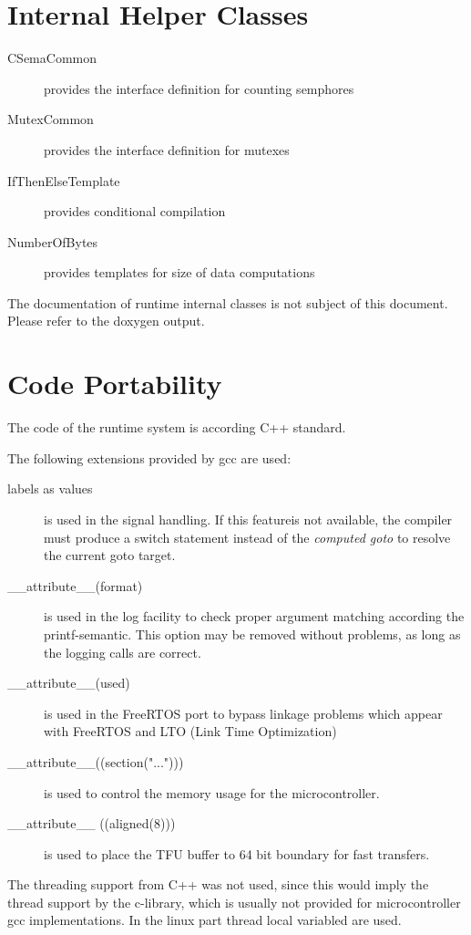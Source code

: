 	\section{Internal Helper Classes}
	\begin{description}
	\item[CSemaCommon]  provides the interface definition for counting semphores
	\item[MutexCommon] provides the interface definition for mutexes
	\item[IfThenElseTemplate] provides conditional compilation
	\item[NumberOfBytes] provides templates for size of data computations
	\end{description}
	The documentation of runtime internal classes is not subject of this document.
	Please refer to the doxygen output.

	\section{Code Portability}
	The code of the runtime system is according C++ standard.

	The following extensions provided by gcc are used:
	\begin{description}
	\item[labels as values] is used in the signal handling. 
	   If this featureis not available, the compiler must produce a switch 
	   statement instead of the {\em computed goto} to resolve
	   the current goto target.
	\item[\_\_attribute\_\_(format)] is used in the log facility to check
	   proper argument matching according the printf-semantic.
	   This option may be removed without problems, as long as the logging
	   calls are correct.
	\item[\_\_attribute\_\_(used)] is used in the FreeRTOS port to bypass linkage
	   problems which appear with FreeRTOS and LTO (Link Time Optimization)
	\item[\_\_attribute\_\_((section("...")))] is used to control the
	   memory usage for the microcontroller.
        \item[ \_\_attribute\_\_ ((aligned(8)))] is used to place 
           the TFU buffer to 64 bit boundary for fast transfers.
	\end{description}
	  
        The threading support from C++ was not used, since this would
        imply the thread support by the c-library, which is usually not 
        provided for microcontroller gcc implementations. In the linux part
        thread local variabled are used.
